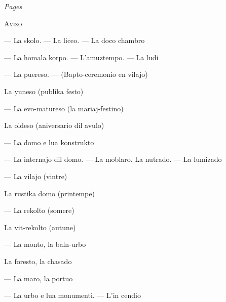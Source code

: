 \begin{VUpage}[109]{}
\VUsaut{3.0mm}
\VUsaut{2.4mm}
\VUfilet{20mm}
\VUsaut{5.0mm}
{\raggedleft\textit{Pages}\par}
\VUsaut{1.0mm}

{\fontsize{10.2pt}{12.2pt}\selectfont
\noindent \textsc{Avizo} 

\noindent {} --- La skolo. --- La liceo. --- La doco\cc
chambro 

\noindent {} --- La homala korpo. --- L'amuztempo.\nl
--- La ludi 

\noindent {} --- La puereso. --- (Bapto-ceremonio en\nl
vilajo) 

\noindent La yuneso (publika festo) 

\noindent {} --- La evo-matureso (la mariaj-festino) 

\noindent La oldeso (aniversario dil avulo) 

\noindent {} --- La domo e lua konstrukto 

\noindent {} --- La internajo dil domo. --- La moblaro.\nl
La nutrado. --- La lumizado 

\noindent {} --- La vilajo (vintre) 

\noindent La rustika domo (printempe) 

\noindent {} --- La rekolto (somere) 

\noindent La vit-rekolto (autune) 

\noindent {} --- La monto, la baln-urbo 

\noindent La foresto, la chasado 

\noindent {} --- La maro, la portuo 

\noindent {} --- La urbo e lua monumenti. --- L'in\cc
cendio 

}
\end{VUpage}
